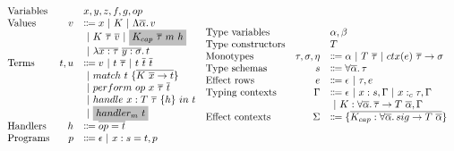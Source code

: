 \documentclass[acmsmall,review,screen]{acmart}
\newcommand{\graybox}[1]{\colorbox{lightgray}{$\displaystyle #1$}}
\newcommand{\vor}{~|~}
\newcommand{\ap}{~}
\newcommand{\ctx}[1]{ctx(#1)~}
\begin{document}
\begin{figure}
    \centering
    \begin{gather*}
        \begin{array}{lrll}
            \text{Variables} & & x, y, z, f, g, op \\
            \text{Values} &v &\Coloneqq x \vor K \vor \Lambda \overline{\alpha} \ldotp v \\
            &&\vor K\ap \overline{\tau} \ap \overline{v} \vor \graybox{K_{cap}\ap\overline{\tau}\ap m\ap h} \\
            &&\vor \lambda \overline{x : \tau}~\overline{y : \sigma}\ldotp t
            \\
            \text{Terms} &t, u &\Coloneqq v \vor t\ap\overline{\tau} \vor t \ap \overline{t} \ap \overline{t} \\
            &&\vor match ~ t ~\{\overline{K \ap \overline{x} \to t}\} \\
            &&\vor perform ~ op \ap x \ap \overline{\tau} \ap \overline{t} \\
            &&\vor handle ~ x : T \ap \overline{\tau} ~ \{h\}~in ~t \\
            &&\vor \graybox{handler_m ~ t}
            \\
            \text{Handlers} &h &\Coloneqq \overline{op = t}
            \\
            \text{Programs} &p &\Coloneqq \epsilon \vor x : s = t, p
        \end{array}
        \begin{array}{lrl}
            \text{Type variables} && \alpha, \beta \\
            \text{Type constructors} && T \\
            \text{Monotypes} & \tau, \sigma, \eta &\Coloneqq \alpha \vor T \ap \overline{\tau} \vor \ctx{e} \overline{\tau} \to \sigma \\
            \text{Type schemas} & s &\Coloneqq \forall\overline{\alpha}\ldotp \tau \\
            \text{Effect rows} & e &\Coloneqq \epsilon\vor \tau, e \\
            \text{Typing contexts} & \Gamma &\Coloneqq \epsilon \vor x : s, \Gamma \vor x :_c \tau, \Gamma \\
            &&\vor K : \forall\overline{\alpha}\ldotp \overline{\tau}\to T\ap \overline{\alpha}, \Gamma \\
            \text{Effect contexts} & \Sigma &\Coloneqq \{\overline{K_{cap} : \forall\overline{\alpha}\ldotp sig\to T\ap\overline{\alpha}}\} \\

\end{array}
\end{gather*}
\end{figure}
\end{document}
